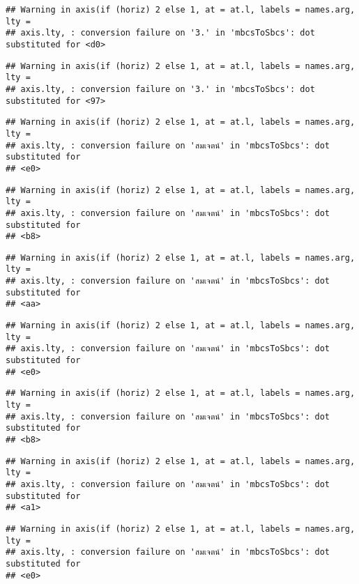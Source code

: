 \documentclass[
]{article}
\begin{document}
\begin{verbatim}
## Warning in axis(if (horiz) 2 else 1, at = at.l, labels = names.arg, lty =
## axis.lty, : conversion failure on 'З.' in 'mbcsToSbcs': dot substituted for <d0>
\end{verbatim}

\begin{verbatim}
## Warning in axis(if (horiz) 2 else 1, at = at.l, labels = names.arg, lty =
## axis.lty, : conversion failure on 'З.' in 'mbcsToSbcs': dot substituted for <97>
\end{verbatim}

\begin{verbatim}
## Warning in axis(if (horiz) 2 else 1, at = at.l, labels = names.arg, lty =
## axis.lty, : conversion failure on 'สมเจตน์' in 'mbcsToSbcs': dot substituted for
## <e0>
\end{verbatim}

\begin{verbatim}
## Warning in axis(if (horiz) 2 else 1, at = at.l, labels = names.arg, lty =
## axis.lty, : conversion failure on 'สมเจตน์' in 'mbcsToSbcs': dot substituted for
## <b8>
\end{verbatim}

\begin{verbatim}
## Warning in axis(if (horiz) 2 else 1, at = at.l, labels = names.arg, lty =
## axis.lty, : conversion failure on 'สมเจตน์' in 'mbcsToSbcs': dot substituted for
## <aa>
\end{verbatim}

\begin{verbatim}
## Warning in axis(if (horiz) 2 else 1, at = at.l, labels = names.arg, lty =
## axis.lty, : conversion failure on 'สมเจตน์' in 'mbcsToSbcs': dot substituted for
## <e0>
\end{verbatim}

\begin{verbatim}
## Warning in axis(if (horiz) 2 else 1, at = at.l, labels = names.arg, lty =
## axis.lty, : conversion failure on 'สมเจตน์' in 'mbcsToSbcs': dot substituted for
## <b8>
\end{verbatim}

\begin{verbatim}
## Warning in axis(if (horiz) 2 else 1, at = at.l, labels = names.arg, lty =
## axis.lty, : conversion failure on 'สมเจตน์' in 'mbcsToSbcs': dot substituted for
## <a1>
\end{verbatim}

\begin{verbatim}
## Warning in axis(if (horiz) 2 else 1, at = at.l, labels = names.arg, lty =
## axis.lty, : conversion failure on 'สมเจตน์' in 'mbcsToSbcs': dot substituted for
## <e0>
\end{verbatim}
\end{document}

